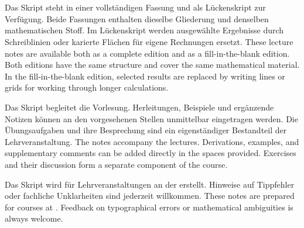 \chapter*{}

\Lang
  {Das Skript steht in einer vollständigen Fassung und als Lückenskript zur
   Verfügung. Beide Fassungen enthalten dieselbe Gliederung und denselben
   mathematischen Stoff. Im Lückenskript werden ausgewählte Ergebnisse durch
   Schreiblinien oder karierte Flächen für eigene Rechnungen ersetzt.}
  {These lecture notes are available both as a complete edition and as a
   fill-in-the-blank edition. Both editions have the same structure and cover the
   same mathematical material. In the fill-in-the-blank edition, selected results
   are replaced by writing lines or grids for working through longer calculations.}

\Lang
  {Das Skript begleitet die Vorlesung. Herleitungen, Beispiele und ergänzende
   Notizen können an den vorgesehenen Stellen unmittelbar eingetragen werden.
   Die Übungsaufgaben und ihre Besprechung sind ein eigenständiger Bestandteil
   der Lehrveranstaltung.}
  {The notes accompany the lectures. Derivations, examples, and supplementary
   comments can be added directly in the spaces provided. Exercises and their
   discussion form a separate component of the course.}

\Lang
  {Das Skript wird für Lehrveranstaltungen an der \Institution erstellt. Hinweise
   auf Tippfehler oder fachliche Unklarheiten sind jederzeit willkommen.}
  {These notes are prepared for courses at \Institution. Feedback on typographical
   errors or mathematical ambiguities is always welcome.}

